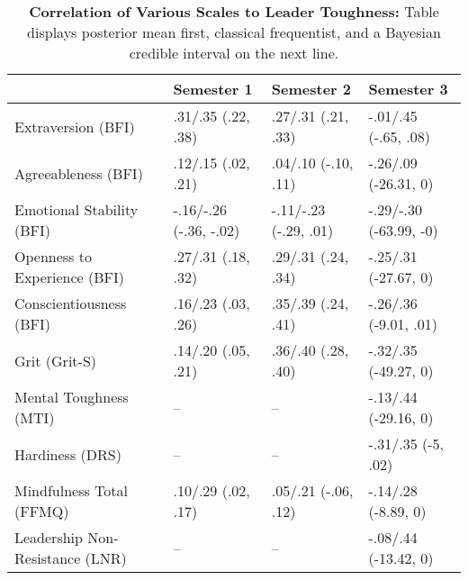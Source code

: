 \begin{table}[ht]
\centering
\begin{tabular}{llll}
  \hline
 & Semester 1 & Semester 2 & Semester 3 \\ 
  \hline
Extraversion (BFI) & .31/.35 (.22, .38) & .27/.31 (.21, .33) & -.01/.45 (-.65, .08) \\ 
  Agreeableness (BFI) & .12/.15 (.02, .21) & .04/.10 (-.10, .11) & -.26/.09 (-26.31, 0) \\ 
  Emotional Stability (BFI) & -.16/-.26 (-.36, -.02) & -.11/-.23 (-.29, .01) & -.29/-.30 (-63.99, -0) \\ 
  Openness to Experience (BFI) & .27/.31 (.18, .32) & .29/.31 (.24, .34) & -.25/.31 (-27.67, 0) \\ 
  Conscientiousness (BFI) & .16/.23 (.03, .26) & .35/.39 (.24, .41) & -.26/.36 (-9.01, .01) \\ 
  Grit (Grit-S) & .14/.20 (.05, .21) & .36/.40 (.28, .40) & -.32/.35 (-49.27, 0) \\ 
  Mental Toughness (MTI) & -- & -- & -.13/.44 (-29.16, 0) \\ 
  Hardiness (DRS) & -- & -- & -.31/.35 (-5, .02) \\ 
  Mindfulness Total (FFMQ) & .10/.29 (.02, .17) & .05/.21 (-.06, .12) & -.14/.28 (-8.89, 0) \\ 
  Leadership Non-Resistance (LNR) & -- & -- & -.08/.44 (-13.42, 0) \\ 
   \hline
\end{tabular}
\caption{\textbf{Correlation of Various Scales to Leader Toughness:} Table displays posterior mean first, classical frequentist, and a Bayesian credible interval on the next line.} 
\label{tab:pers_corr}
\end{table}
